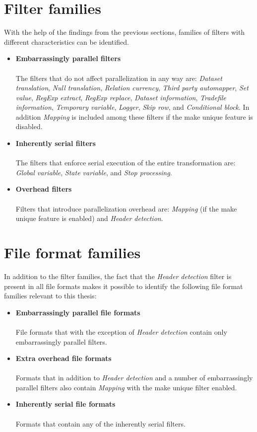 \section{Filter families}
With the help of the findings from the previous sections, families of filters with different characteristics can be identified.

\begin{itemize}
\item \textbf{Embarrassingly parallel filters} \\\\
The filters that do not affect parallelization in any way are:
\textit{Dataset translation}, \textit{Null translation}, \textit{Relation currency},
\textit{Third party automapper}, \textit{Set value}, \textit{RegExp extract}, \textit{RegExp replace},
\textit{Dataset information}, \textit{Tradefile information}, \textit{Temporary variable}, \textit{Logger}, \textit{Skip row}, and \textit{Conditional block}.
In addition \textit{Mapping} is included among these filters if the make unique feature is disabled.
\item \textbf{Inherently serial filters} \\\\
The filters that enforce serial execution of the entire transformation are: \textit{Global variable}, \textit{State variable}, and \textit{Stop processing}.
\item \textbf{Overhead filters} \\\\ 
Filters that introduce parallelization overhead are: \textit{Mapping} (if the make unique feature is enabled) and \textit{Header detection}.
\end{itemize}

\section{File format families}
In addition to the filter families, the fact that the \textit{Header detection} filter is present in all file formats makes it possible to identify the following
file format families relevant to this thesis:

\begin{itemize}
\item \textbf{Embarrassingly parallel file formats} \\\\
  File formats that with the exception of \textit{Header detection} contain only embarrassingly parallel filters. 
\item \textbf{Extra overhead file formats} \\\\
  Formats that in addition to \textit{Header detection} and a number of embarrassingly parallel filters also contain \textit{Mapping} with the make unique filter enabled.
\item \textbf{Inherently serial file formats} \\\\
  Formats that contain any of the inherently serial filters.
\end{itemize}

